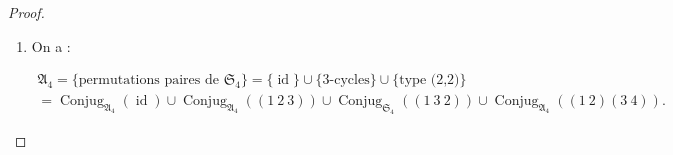 \documentclass[french]{book}
\theoremstyle{definition}
\newtheorem*{protoremark}{Remarque}
\newenvironment{remark}
    {\colorlet{shadecolor}{yellow!5}\begin{shaded}\begin{protoremark}}
    {\end{protoremark}\end{shaded}}
\begin{document}
\begin{proof}
\begin{enumerate}
\begin{enumerate}
      \item Le stabilisateur de \(\sigma\) dans \(\mathfrak{S}_{4}\) est le centralisateur de \(\sigma\) dans \(\mathfrak{S}_{4}\) (dans ce cas précis), à savoir l'ensemble des permutations de \(\mathfrak{S}_{4}\) qui commutent avec \(\sigma\). Or :

      \begin{itemize}
        \item \(e\) commute avec \(\sigma\) ;
        \item \(\sigma\) commute avec \(\sigma\) ;
        \item \(\sigma^{-1} = \sigma^2\) commute avec \(\sigma\).
      \end{itemize}

      Puisque \(\operatorname{Stab}_{\mathfrak{S}_{4}}(\sigma)\) est d'ordre 3, on a donc :

      \[\operatorname{Stab}_{\mathfrak{S}_{4}}(\sigma) = \{ e, \sigma, \sigma^2 \}.\]

      Or les permutations \(e, \sigma, \sigma ^2\) sont toutes paires, d'où le résultat.

      \item On a \[\operatorname{Conjug}_{\mathfrak{S}_{4}}(\sigma) = \{ \text{3-cycles de } \mathfrak{S}_{4}\} = \{ (1 \ 2 \ 3), (1 \ 3 \ 2), (1 \ 2 \ 4), (1 \ 4 \ 2), (1 \ 3 \ 4), (1 \ 4 \ 3), (2 \ 3 \ 4), (2 \ 4 \ 3)\}.\]

      Cette classe de conjugaison dans \(\mathfrak{S}_{4}\) se décompose en deux classes de conjugaison dans \(\mathfrak{S}_{4}\) en quatre éléments chacune.

      \[\operatorname{Conjug}_{\mathfrak{A}_4}((1 \ 2 \ 3)) = \{ (1 \ 2 \ 3), (1 \ 4 \ 2), (1 \ 3 \ 4), (2 \ 4 \ 3) \}\]

      et

      \[\operatorname{Conjug}_{\mathfrak{S}_{4}}((1 \ 3 \ 2)) = \{ (1 \ 3 \ 2), (1 \ 2 \ 4), (1 \ 4 \ 3), (2 \ 3 \ 4) \}.\]

      \begin{remark}
        En revanche, les types (2,2) constituent une classe de conjugaison dans \(\mathfrak{A}_4\), car il existe une permutation impaire qui commute avec \((1 \ 2)(3 \ 4)\), à savoir \((1 \ 2)\).
      \end{remark}
    \end{enumerate}

    \item On a :

    \begin{gather*}
      \mathfrak{A}_4 = \{ \text{permutations paires de } \mathfrak{S}_{4}\} = \{ \operatorname{id}\} \cup \{ \text{3-cycles} \} \cup \{ \text{type (2,2)}\} \\
      = \operatorname{Conjug}_{\mathfrak{A}_{4}}(\operatorname{id}) \cup \operatorname{Conjug}_{\mathfrak{A}_{4}}((1 \ 2 \ 3)) \cup\operatorname{Conjug}_{\mathfrak{S}_{4}}((1 \ 3 \ 2)) \cup  \operatorname{Conjug}_{\mathfrak{A}_{4}}((1 \ 2)(3 \ 4)).
    \end{gather*}


\end{enumerate}
\end{proof}
\end{document}
